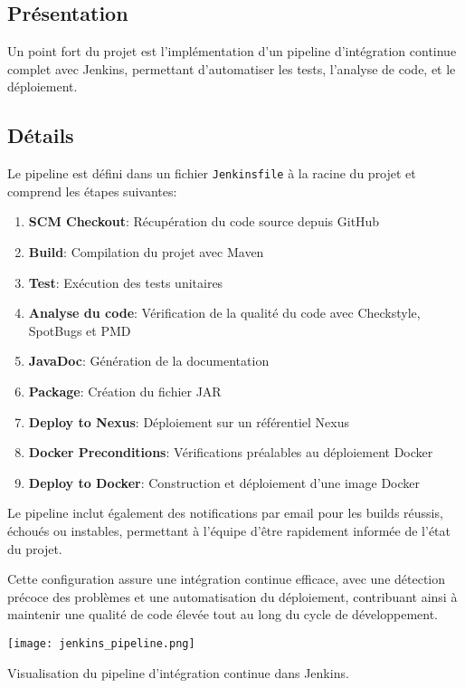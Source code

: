 \subsection{Présentation}
Un point fort du projet est l'implémentation d'un pipeline d'intégration continue complet avec Jenkins, permettant d'automatiser les tests, l'analyse de code, et le déploiement.

\subsection{Détails}
Le pipeline est défini dans un fichier \texttt{Jenkinsfile} à la racine du projet et comprend les étapes suivantes:

\begin{enumerate}
  \item \textbf{SCM Checkout}: Récupération du code source depuis GitHub
  \item \textbf{Build}: Compilation du projet avec Maven
  \item \textbf{Test}: Exécution des tests unitaires
  \item \textbf{Analyse du code}: Vérification de la qualité du code avec Checkstyle, SpotBugs et PMD
  \item \textbf{JavaDoc}: Génération de la documentation
  \item \textbf{Package}: Création du fichier JAR
  \item \textbf{Deploy to Nexus}: Déploiement sur un référentiel Nexus
  \item \textbf{Docker Preconditions}: Vérifications préalables au déploiement Docker
  \item \textbf{Deploy to Docker}: Construction et déploiement d'une image Docker
\end{enumerate}

Le pipeline inclut également des notifications par email pour les builds réussis, échoués ou instables, permettant à l'équipe d'être rapidement informée de l'état du projet.

Cette configuration assure une intégration continue efficace, avec une détection précoce des problèmes et une automatisation du déploiement, contribuant ainsi à maintenir une qualité de code élevée tout au long du cycle de développement.

\begin{center}
\begin{minipage}{\textwidth}
  \begin{tcolorbox}[enhanced, colback=lightgray, colframe=accentblue, arc=5pt, boxrule=0.5pt, drop shadow]
    \centering
    \texttt{[image: jenkins\_pipeline.png]}
    \label{fig:jenkins-pipeline}
    \vspace{0.5cm}
    \parbox{0.9\textwidth}{\centering Visualisation du pipeline d'intégration continue dans Jenkins.}
  \end{tcolorbox}
\end{minipage}
\end{center} 